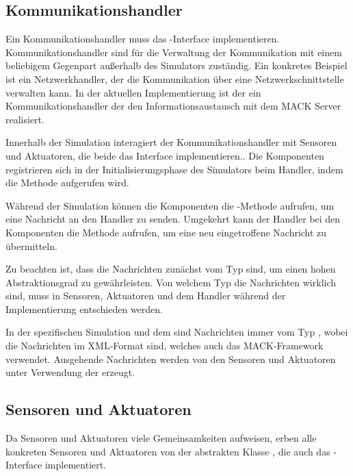 \subsection{Kommunikationshandler}\label{subsec:concept_communication}
Ein Kommunikationshandler muss das -Interface implementieren. Kommunikationshandler sind für die Verwaltung der Kommunikation mit einem beliebigem Gegenpart außerhalb des Simulators zuständig. Ein konkretes Beispiel ist ein Netzwerkhandler, der die Kommunikation über eine Netzwerkschnittstelle verwalten kann. In der aktuellen Implementierung ist der  ein Kommunikationshandler der den Informationsaustausch mit dem MACK Server realisiert.

Innerhalb der Simulation interagiert der Kommunikationshandler mit Sensoren und Aktuatoren, die beide das Interface  implementieren.. Die Komponenten registrieren sich in der Initialisierungsphase des Simulators beim Handler, indem die Methode  aufgerufen wird.

Während der Simulation können die Komponenten die -Methode aufrufen, um eine Nachricht an den Handler zu senden. Umgekehrt kann der Handler bei den Komponenten die Methode  aufrufen, um eine neu eingetroffene Nachricht zu übermitteln.

Zu beachten ist, dass die Nachrichten zunächst vom Typ  sind, um einen hohen Abstraktionsgrad zu gewährleisten. Von welchem Typ die Nachrichten wirklich sind, muss in Sensoren, Aktuatoren und dem Handler während der Implementierung entschieden werden.

In der spezifischen Simulation und dem  sind Nachrichten immer vom Typ , wobei die Nachrichten im XML-Format sind, welches auch das MACK-Framework verwendet. Ausgehende Nachrichten werden von den Sensoren und Aktuatoren unter Verwendung der  erzeugt.


\subsection{Sensoren und Aktuatoren}\label{subsec:concept_actuators_sensors}
Da Sensoren und Aktuatoren viele Gemeinsamkeiten aufweisen, erben alle konkreten Sensoren und Aktuatoren von der abstrakten Klasse , die auch das -Interface implementiert.

